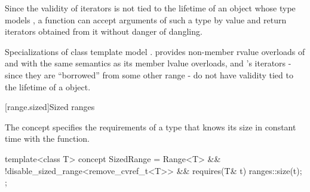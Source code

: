 \begin{itemdescr}
\pnum
\begin{note}
Since the validity of iterators is not tied to the lifetime of
an object whose type models ,
a function can accept arguments of such a type by value and
return iterators obtained from it without danger of dangling.
\end{note}

\pnum
\begin{example}
Specializations of class template 
model .  provides
non-member rvalue overloads of  and  with the same
semantics as its member lvalue overloads, and 's iterators
- since they are ``borrowed'' from some other range -
do not have validity tied to the lifetime of a  object.
\end{example}
\end{itemdescr}

[range.sized]{Sized ranges}

\pnum
The  concept specifies the requirements
of a  type that knows its size in constant time with the
 function.

%
\begin{itemdecl}
template<class T>
  concept SizedRange =
    Range<T> &&
    !disable_sized_range<remove_cvref_t<T>> &&
    requires(T& t) { ranges::size(t); };
\end{itemdecl}

